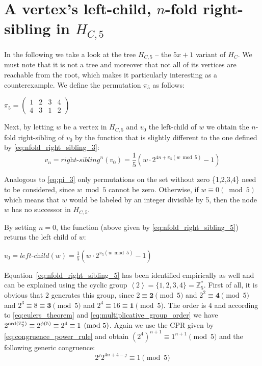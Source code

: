 \section{\texorpdfstring{A vertex's left-child, $n$-fold right-sibling in $H_{C,5}$}{A vertex's left-child, n-fold right-sibling in HC5}}
\label{sec:left_child_right_sibling_5}

In the following we take a look at the tree $H_{C,5}$ -- the $5x+1$ variant of $H_C$. We must note that it is not a tree and moreover that not all of its vertices are reachable from the root, which makes it particularly interesting as a counterexample. We define the permutation $\pi_5$ as follows:  
\begin{center}
\label{eq:pi_5}
    $\pi_5=\left(\begin{array}{cccc}
    	1 & 2 & 3 & 4\\
    	4 & 3 & 1 & 2
    \end{array}\right)$	
\end{center}

Next, by letting $w$ be a vertex in $H_{C,5}$ and $v_0$ the left-child of $w$
we obtain the $n$-fold right-sibling of $v_0$ by the function that
is slightly different to the one defined by \ref{eq:nfold_right_sibling_3}:
\begin{equation}
\label{eq:nfold_right_sibling_5}
    v_n=\textit{right-sibling}^n(v_0)=\frac{1}{5}\left(w\cdot2^{4n+\pi_5(w\bmod 5)}-1\right)
\end{equation}

Analogous to \ref{eq:pi_3} only permutations on the set without zero
\{1,2,3,4\} need to be considered, since $w\bmod 5$ cannot be zero.
Otherwise, if $w\equiv 0 (\bmod 5)$ which means that $w$ would be labeled
by an integer divisible by 5, then the node $w$ has no successor in $H_{C,5}$.

\noindent
By setting $n=0$, the function (above given by \ref{eq:nfold_right_sibling_5}) returns the left child of $w$:
\begin{center}
	$v_0=\textit{left-child}(w)=\frac{1}{5}\left(w\cdot2^{\pi_5(w\bmod 5)}-1\right)$
\end{center}

Equation~\ref{eq:nfold_right_sibling_5} has been identified empirically as well and can be explained using the cyclic group $\left<2\right>=\{1,2,3,4\}=\mathbb{Z}_5^\ast$. First of all, it is obvious that $2$ generates this group, since $2\equiv\boldsymbol{2}\pmod5$ and $2^2\equiv\boldsymbol{4}\pmod5$ and $2^3\equiv8\equiv\boldsymbol{3}\pmod5$ and $2^4\equiv16\equiv\boldsymbol{1}\pmod5$. The order is $4$ and according to \ref{eq:eulers_theorem} and \ref{eq:multiplicative_group_order} we have $2^{\operatorname{ord}(\mathbb{Z}_5^\ast)}\equiv2^{\phi(5)}\equiv2^4\equiv1\pmod5$. Again we use the CPR given by \ref{eq:congruence_power_rule} and obtain $(2^4)^{n+1}\equiv1^{n+1}\pmod5$ and the following generic congruence:
\begin{equation}
\label{eq:congruence_k5}
2^j2^{4n+4-j}\equiv1\pmod5
\end{equation}

